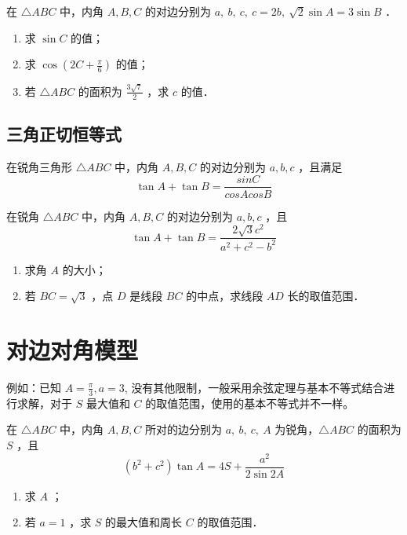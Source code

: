 \begin{example}
    在 $\triangle A B C$ 中，内角 $A, B, C$ 的对边分别为 $a, ~ b, ~ c, ~ c=2 b, ~ \sqrt{2} \sin A=3 \sin B$ ．
    \begin{enumerate}
        \item 求 $\sin C$ 的值；
        \item 求 $\cos \left(2 C+\frac{\pi}{6}\right)$ 的值；
        \item 若 $\triangle A B C$ 的面积为 $\frac{3 \sqrt{7}}{2}$ ，求 $c$ 的值．
    \end{enumerate}
\end{example}
\vspace{4em}

\subsection{三角正切恒等式}
\begin{theorem}[正切相加恒等式]
    在锐角三角形 $\triangle ABC$ 中，内角 $A, B, C$ 的对边分别为 $a, b, c$ ，且满足
    $$
        \tan A + \tan B = \frac{sinC}{cosAcosB}
    $$
\end{theorem}

\begin{example}
    在锐角 $\triangle A B C$ 中，内角 $A, B, C$ 的对边分别为 $a, b, c$ ，且
    $$
        \tan A+\tan B=\frac{2 \sqrt{3} c^2}{a^2+c^2-b^2}
    $$
    \begin{enumerate}
        \item 求角 $A$ 的大小；
        \item 若 $B C=\sqrt{3}$ ，点 $D$ 是线段 $B C$ 的中点，求线段 $A D$ 长的取值范围．
    \end{enumerate}
\end{example}
\vspace{6em}

\section{对边对角模型}

\begin{theorem}[无限制的对边对角模型]
    例如：已知 $A = \frac{\pi}{3}, a=3$, 没有其他限制，一般采用余弦定理与基本不等式结合进行求解，对于 $S$ 最大值和 $C$ 的取值范围，使用的基本不等式并不一样。
\end{theorem}

\begin{example}
    在 $\triangle A B C$ 中，内角 $A, B, C$ 所对的边分别为 $a, ~ b, ~ c, ~ A$ 为锐角，$\triangle A B C$ 的面积为 $S$ ，且
    $$
        \left(b^2+c^2\right) \tan A=4 S+\frac{a^2}{2 \sin 2 A}
    $$
    \begin{enumerate}
        \item 求 $A$ ；
        \item 若 $a=1$ ，求 $S$ 的最大值和周长 $C$ 的取值范围．
    \end{enumerate}
\end{example}

